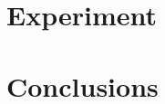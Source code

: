 \documentclass[conference]{IEEEtran}
\begin{document}
\section{Experiment}
\section{Conclusions}

\newpage

%
%
%


  
  





\end{document}
